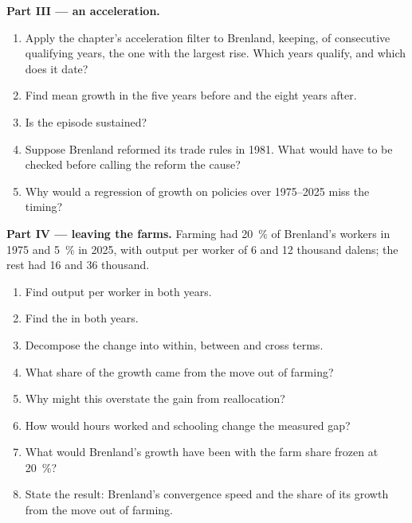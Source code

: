 \begin{problem}
\medskip\noindent\textbf{Part III --- an acceleration.}
\begin{enumerate}[resume]
\item Apply the chapter's acceleration filter to Brenland, keeping, of consecutive
qualifying years, the one with the largest rise. Which years qualify, and which does it date?
\item Find mean growth in the five years before and the eight years after.
\item Is the episode sustained?
\item Suppose Brenland reformed its trade rules in 1981. What would have to be checked
before calling the reform the cause?
\item Why would a regression of growth on policies over 1975--2025 miss the timing?
\end{enumerate}

\medskip\noindent\textbf{Part IV --- leaving the farms.} Farming had 20~\% of Brenland's workers in 1975
and 5~\% in 2025, with output per worker of 6 and 12 thousand dalens; the rest had 16 and 36 thousand.
\begin{enumerate}[resume]
\item Find output per worker in both years.
\item Find the  in both years.
\item Decompose the change into within, between and cross terms.
\item What share of the growth came from the move out of farming?
\item Why might this overstate the gain from reallocation?
\item How would hours worked and schooling change the measured gap?
\item What would Brenland's growth have been with the farm share frozen at 20~\%?
\item State the result: Brenland's convergence speed and the share of its growth from
the move out of farming.
\end{enumerate}
\end{problem}
